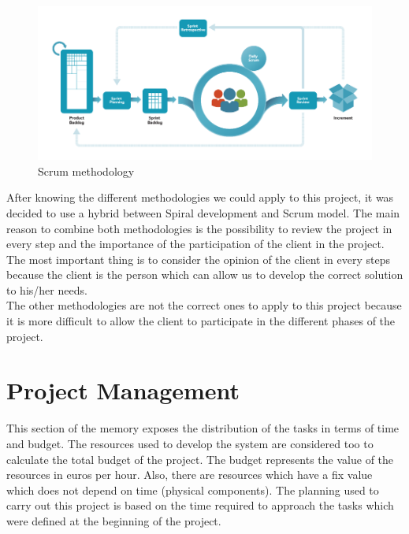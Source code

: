 \begin{enumerate}
\begin{figure}[H]
\begin{centering}
\includegraphics[scale=0.5]{IMGS/Scrum.png}
\caption{Scrum methodology \label{Scrum methodology}}
\end{centering}
\end{figure} 

\end{enumerate}

After knowing the different methodologies we could apply to this project, it was decided to use a hybrid between Spiral development and Scrum model. The main reason to combine both methodologies is the possibility to review the project in every step and the importance of the participation of the client in the project. The most important thing is to consider the opinion of the client in every steps because the client is the person which can allow us to develop the correct solution to his/her needs.\\

The other methodologies are not the correct ones to apply to this project because it is more difficult to allow the client to participate in the different phases of the project.

\section{Project Management}

This section of the memory exposes the distribution of the tasks in terms of time and budget. The resources used to develop the system are considered too to calculate the total budget of the project. The budget represents the value of the resources in euros per hour. Also, there are resources which have a fix value which does not depend on time (physical components). The planning used to carry out this project is based on the time required to approach the tasks which were defined at the beginning of the project.\\

